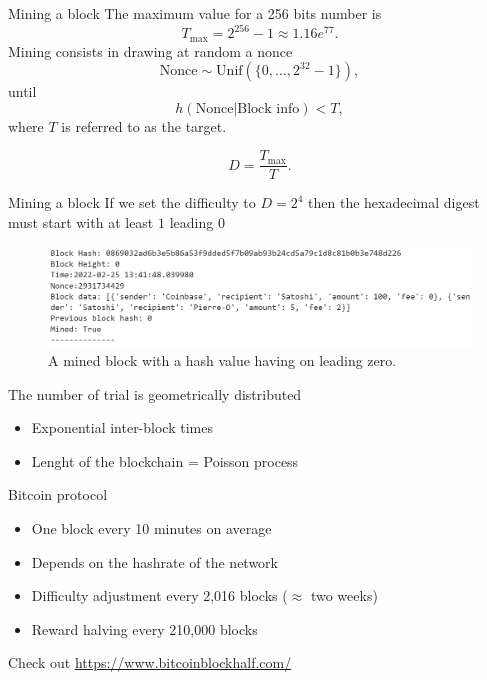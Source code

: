 \documentclass{beamer}
\begin{document}
\begin{frame}{Mining a block}
The maximum value for a 256 bits number is
$$
T_\text{max} = 2^{256}-1 \approx 1.16e^{77}.
$$
Mining consists in drawing at random a nonce 
$$
\text{Nonce} \sim \text{Unif}(\{0,\ldots, 2^{32}-1\}),
$$
until 
$$
h(\text{Nonce}|\text{Block info})<T,
$$
where $T$ is referred to as the target.
\begin{tcolorbox}[enhanced,drop shadow, title=Difficulty of the cryptopuzzle]
$$
D = \frac{T_{\max}}{T}.
$$
\end{tcolorbox}

\end{frame}
\begin{frame}{Mining a block}
If we set the difficulty to $D = 2^4$ then the hexadecimal digest must start with at least $1$ leading $0$
\begin{figure}[!ht]
    \includegraphics[width = \textwidth]{../../Figures/block_mined.png}
    \captionsetup{width=0.8\textwidth}
    \centering
    \caption{A mined block with a hash value having on leading zero.}
    \label{fig:block_mined}
\end{figure}
The number of trial is geometrically distributed
\begin{itemize}
\item Exponential inter-block times
\item Lenght of the blockchain = Poisson process
\end{itemize}
\end{frame}
\begin{frame}{Bitcoin protocol}
\begin{itemize}
  \item One block every 10 minutes on average
  \item Depends on the hashrate of the network
  \item Difficulty adjustment every 2,016 blocks ($\approx$ two weeks)
  \item Reward halving every 210,000 blocks
\end{itemize}
Check out \url{https://www.bitcoinblockhalf.com/}
\end{frame}
\end{document}
